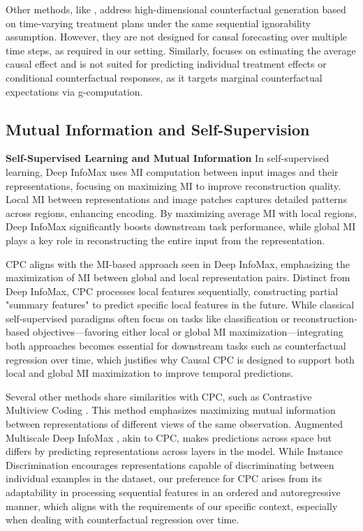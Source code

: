 \documentclass{article}
\theoremstyle{plain}
\theoremstyle{definition}
\theoremstyle{remark}
\begin{document}
Other methods, like \cite{wu2023counterfactual}, address high-dimensional counterfactual generation based on time-varying treatment plans under the same sequential ignorability assumption. However, they are not designed for causal forecasting over multiple time steps, as required in our setting. Similarly, \cite{frauen2023estimating} focuses on estimating the average causal effect and is not suited for predicting individual treatment effects or conditional counterfactual responses, as it targets marginal counterfactual expectations via g-computation.

\subsection{Mutual Information and Self-Supervision}
\label{subsect: extended_work_mi_ss}
\textbf{Self-Supervised Learning and Mutual Information} In self-supervised learning, Deep InfoMax \cite{DeepInfoMax2019} uses MI computation between input images and their representations, focusing on maximizing MI to improve reconstruction quality. Local MI between representations and image patches captures detailed patterns across regions, enhancing encoding. By maximizing average MI with local regions, Deep InfoMax significantly boosts downstream task performance, while global MI plays a key role in reconstructing the entire input from the representation.

CPC aligns with the MI-based approach seen in Deep InfoMax, emphasizing the maximization of MI between global and local representation pairs. Distinct from Deep InfoMax, CPC processes local features sequentially, constructing partial "summary features" to predict specific local features in the future. While classical self-supervised paradigms often focus on tasks like classification or reconstruction-based objectives—favoring either local or global MI maximization—integrating both approaches becomes essential for downstream tasks such as counterfactual regression over time, which justifies why Causal CPC is designed to support both local and global MI maximization to improve temporal predictions.

Several other methods share similarities with CPC, such as Contrastive Multiview Coding \cite{tian2020contrastive}. This method emphasizes maximizing mutual information between representations of different views of the same observation. Augmented Multiscale Deep InfoMax \cite{bachman2019learning}, akin to CPC, makes predictions across space but differs by predicting representations across layers in the model. While Instance Discrimination \cite{zhao2020makes} encourages representations capable of discriminating between individual examples in the dataset, our preference for CPC arises from its adaptability in processing sequential features in an ordered and autoregressive manner, which aligns with the requirements of our specific context, especially when dealing with counterfactual regression over time.
\end{document}
